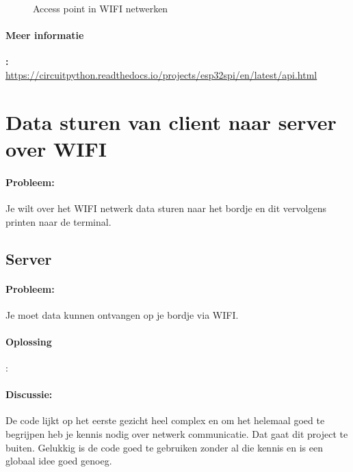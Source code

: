	\begin{figure}[!htb]
		\caption{Access point in WIFI netwerken}
		\label{fig:AccessPoint}
	\end{figure}
	
	\paragraph{Meer informatie}\textbf{:}\\
	\url{https://circuitpython.readthedocs.io/projects/esp32spi/en/latest/api.html}


\section{Data sturen van client naar server over WIFI}\label{sec:WIFIdata}
	\paragraph{Probleem:} Je wilt over het WIFI netwerk data sturen naar het bordje en dit vervolgens printen naar de terminal.
	
	\subsection{Server}
		\paragraph{Probleem:} Je moet data kunnen ontvangen op je bordje via WIFI.
		\paragraph{Oplossing}: 
		
		\paragraph{Discussie:} De code lijkt op het eerste gezicht heel complex en om het helemaal goed te begrijpen heb je kennis nodig over netwerk communicatie. Dat gaat dit project te buiten. Gelukkig is de code goed te gebruiken zonder al die kennis en is een globaal idee goed genoeg. 
		
